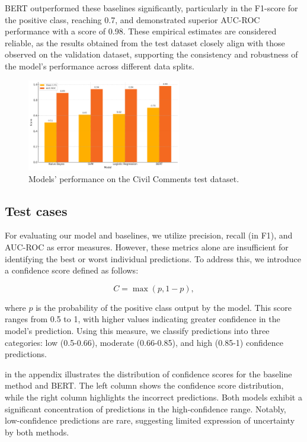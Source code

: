 BERT outperformed these baselines significantly, particularly in the F1-score for the positive class, reaching 0.7, and demonstrated superior AUC-ROC performance with a score of 0.98. These empirical estimates are considered reliable, as the results obtained from the test dataset closely align with those observed on the validation dataset, supporting the consistency and robustness of the model's performance across different data splits.

\begin{figure}[ht]
    \centering
    \includegraphics[width=0.6\textwidth]{./figures/performance_compare.png}
    \caption{Models' performance on the Civil Comments test dataset.}
    \label{fig:performance}
\end{figure}

\subsection{Test cases}
For evaluating our model and baselines, we utilize precision, recall (in F1), and AUC-ROC as error measures. However, these metrics alone are insufficient for identifying the best or worst individual predictions. To address this, we introduce a confidence score defined as follows:

\begin{equation}
    C = \max(p, 1 - p),
\end{equation}

\noindent where $p$ is the probability of the positive class output by the model. This score ranges from 0.5 to 1, with higher values indicating greater confidence in the model's prediction. Using this measure, we classify predictions into three categories: low (0.5-0.66), moderate (0.66-0.85), and high (0.85-1) confidence predictions.

 in the appendix illustrates the distribution of confidence scores for the baseline method and BERT. The left column shows the confidence score distribution, while the right column highlights the incorrect predictions. Both models exhibit a significant concentration of predictions in the high-confidence range. Notably, low-confidence predictions are rare, suggesting limited expression of uncertainty by both methods.

